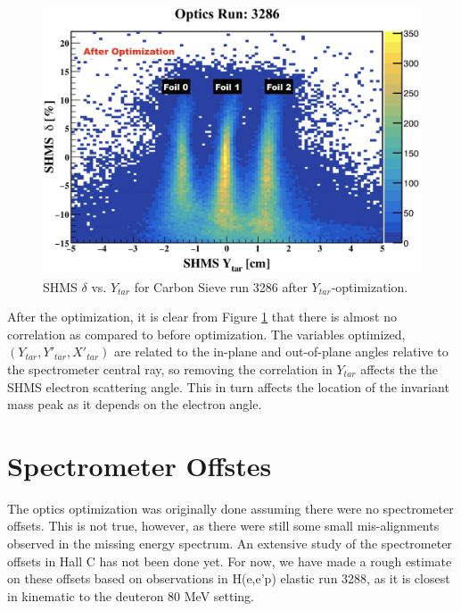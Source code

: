 \documentclass[11pt]{article}
\begin{document}
\begin{figure}[h!]
  \centering
  \includegraphics[scale=0.4]{plots/SHMS_delta_vs_ytar_3286_afterOptim.png}
  \caption{SHMS $\delta$ vs. $Y_{tar}$ for Carbon Sieve run 3286 after $Y_{tar}$-optimization.}
  \label{fig:shmsYtar_afterOptim}
\end{figure}
After the optimization, it is clear from Figure \ref{fig:shmsYtar_afterOptim} that there is almost no
correlation as compared to before optimization. The variables optimized, $(Y_{tar}, Y'_{tar}, X'_{tar})$ are
related to the in-plane and out-of-plane angles relative to the spectrometer central ray, so removing the correlation
in $Y_{tar}$ affects the the SHMS electron scattering angle. This in turn affects the location of the invariant mass peak as it depends
on the electron angle.
\section{Spectrometer Offstes} \label{sec:spec_off_sec}
\noindent The optics optimization was originally done assuming there were no spectrometer offsets. This is not true,
however, as there were still some small mis-alignments observed in the missing energy spectrum. An extensive study
of the spectrometer offsets in Hall C has not been done yet. For now, we have made a rough estimate on these
offsets based on observations in H(e,e'p) elastic run 3288, as it is closest in kinematic to the deuteron 80 MeV setting.
\end{document}
